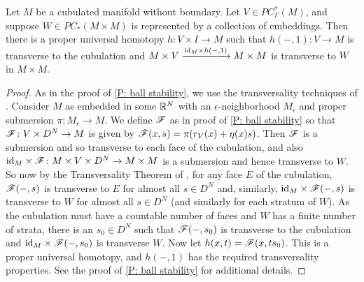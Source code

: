 \begin{comment}
	\begin{lemma}\red{REMOVE???:}
		Suppose $M$ is a cubulated manifold without boundary and $V \in PC^*_{\Gamma\pf}(M)$.
		Then $\id_M \times r_V \colon M \times V \to M \times M$ is transverse to the product cubulation of $M \times M$.
	\end{lemma}
	\begin{proof}
		Easy = see if I did this earlier somewhere
	\end{proof}

	\red{Note $\mc J$ commutes with $\Delta$ and switch them below.}
\end{comment}

\begin{lemma}\label{L: product transversal}
	Let $M$ be a cubulated manifold without boundary.
	Let $V \in PC^*_{\Gamma}(M)$, and suppose $W \in PC_*(M \times M)$ is represented by a collection of embeddings.
	Then there is a proper universal homotopy $h \colon V \times I \to M$ such that $h(-,1) \colon V \to M$ is transverse to the cubulation and $M \times V \xrightarrow{\mathrm{id}_M \times h(-,1)} M \times M$ is transverse to $W$ in $M \times M$.
\end{lemma}

\begin{proof}
	As in the proof of \cref{P: ball stability}, we use the transversality techniques of \cite[Section 2.3]{GuPo74}.
	Consider $M$ as embedded in some $\mathbb{R}^N$ with an $\epsilon$-neighborhood $M_\epsilon$ and proper submersion $\pi \colon M_\epsilon \to M$.
	We define $\mathscr{F}$ as in proof of \cref{P: ball stability} so that $\mathscr{F} \colon V \times D^N \to M$ is given by $\mathscr{F}(x,s) = \pi(r_V(x)+\eta(x)s)$.
	Then $\mathscr{F}$ is a submersion and so transverse to each face of the cubulation, and also $\mathrm{id}_M \times \mathscr{F} \colon M \times V \times D^N \to M \times M$ is a submersion and hence transverse to $W$.
	So now by the Transversality Theorem of \cite[Section 2.3]{GuPo74}, for any face $E$ of the cubulation, $\mathscr{F}(-,s)$ is transverse to $E$ for almost all $s \in D^N$ and, similarly, $\mathrm{id}_M \times \mathscr{F}(-,s)$ is transverse to $W$ for almost all $s \in D^N$ (and similarly for each stratum of $W$).
	As the cubulation must have a countable number of faces and $W$ has a finite number of strata, there is an $s_0 \in D^N$ such that $\mathscr{F}(-,s_0)$ is transverse to the cubulation and $\mathrm{id}_M \times \mathscr{F}(-,s_0)$ is transverse $W$.
	Now let $h(x,t) = \mathscr{F}(x,ts_0)$.
	This is a proper universal homotopy, and $h(-,1)$ has the required transversality properties.
	See the proof of \cref{P: ball stability} for additional details.
\end{proof}

